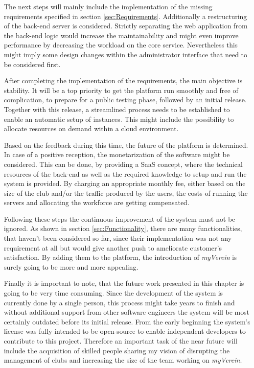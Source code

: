 The next steps will mainly include the implementation of the missing requirements specified in section \vref{sec:Requirements}. Additionally a restructuring of the back-end server is considered. Strictly separating the web application from the back-end logic would increase the maintainability and might even improve performance by decreasing the workload on the core service. Nevertheless this might imply some design changes within the administrator interface that need to be considered first.

After completing the implementation of the requirements, the main objective is stability. It will be a top priority to get the platform run smoothly and free of complication, to prepare for a public testing phase, followed by an initial release. Together with this release, a streamlined process needs to be established to enable an automatic setup of instances. This might include the possibility to allocate resources on demand within a cloud environment.

Based on the feedback during this time, the future of the platform is determined. In case of a positive reception, the monetarization of the software might be considered. This can be done, by providing a \gls{SaaS} concept, where the technical resources of the back-end as well as the required knowledge to setup and run the system is provided. By charging an appropriate monthly fee, either based on the size of the club and/or the traffic produced by the users, the costs of running the servers and allocating the workforce are getting compensated.

Following these steps the continuous improvement of the system must not be ignored. As shown in section \vref{sec:Functionality}, there are many functionalities, that haven't been considered so far, since their implementation was not any requirement at all but would give another push to ameliorate customer's satisfaction. By adding them to the platform, the introduction of \emph{myVerein} is surely going to be more and more appealing.

Finally it is important to note, that the future work presented in this chapter is going to be very time consuming. Since the development of the system is currently done by a single person, this process might take years to finish and without additional support from other software engineers the system will be most certainly outdated before its initial release. From the early beginning the system's license was fully intended to be open-source to enable independent developers to contribute to this project. Therefore an important task of the near future will include the acquisition of skilled people sharing my vision of disrupting the management of clubs and increasing the size of the team working on \emph{myVerein}.






